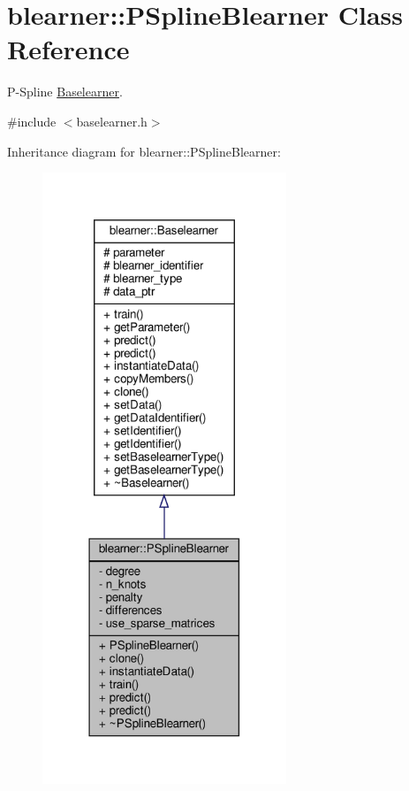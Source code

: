 \hypertarget{classblearner_1_1_p_spline_blearner}{}\section{blearner\+:\+:P\+Spline\+Blearner Class Reference}
\label{classblearner_1_1_p_spline_blearner}


P-\/\+Spline \hyperlink{classblearner_1_1_baselearner}{Baselearner}.  




{\ttfamily \#include $<$baselearner.\+h$>$}



Inheritance diagram for blearner\+:\+:P\+Spline\+Blearner\+:\nopagebreak
\begin{figure}[H]
\begin{center}
\leavevmode
\includegraphics[width=207pt]{classblearner_1_1_p_spline_blearner__inherit__graph}
\end{center}
\end{figure}


